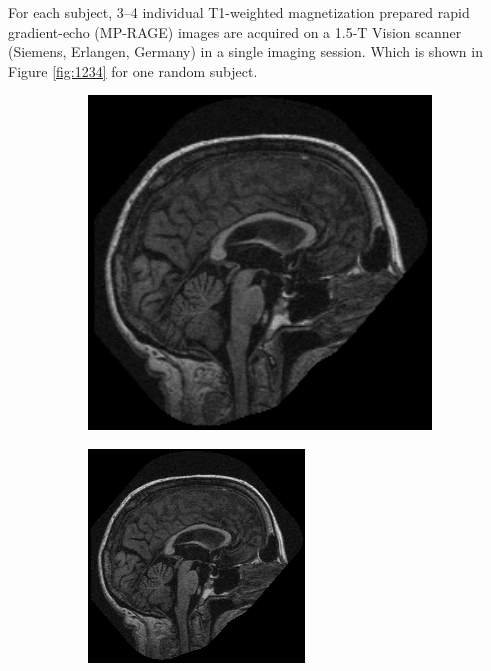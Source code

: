 For  each  subject,  3–4  individual  T1-weighted  magnetization  prepared  rapid  gradient-echo  (MP-RAGE)  images are  acquired  on a  1.5-T  Vision  scanner (Siemens,  Erlangen,  Germany) in  a single  imaging  session. Which is shown in Figure \ref{fig:1234} for one random subject.


\begin{figure}
	\centering
	\begin{subfigure}{.23\textwidth}
		\centering\includegraphics[width=1.014\textwidth]{images/1.png}
	\end{subfigure}
	\begin{subfigure}{.23\textwidth}
		\centering\includegraphics[width=\textwidth]{images/2.png}
	\end{subfigure}
	

\end{figure}
